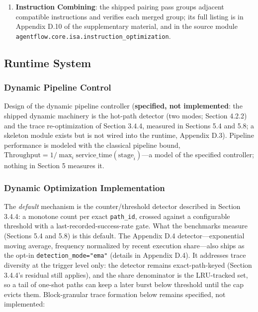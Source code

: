 \documentclass[
  sigconf,
  anonymous]{acmart}
\providecommand{\tightlist}{%
  \setlength{\itemsep}{0pt}\setlength{\parskip}{0pt}}
\begin{document}
\begin{enumerate}
\def\labelenumi{\arabic{enumi}.}
\setcounter{enumi}{1}
\tightlist
\item
  \textbf{Instruction Combining}: the shipped pairing pass groups
  adjacent compatible instructions and verifies each merged group; its
  full listing is in Appendix D.10 of the supplementary material, and in
  the source module
  \texttt{agentflow.core.isa.instruction\_optimization}.
\end{enumerate}

\subsection{Runtime System}\label{runtime-system}

\subsubsection{Dynamic Pipeline Control}\label{dynamic-pipeline-control}

Design of the dynamic pipeline controller (\textbf{specified, not
implemented}: the shipped dynamic machinery is the hot-path detector
(two modes; Section 4.2.2) and the trace re-optimization of Section
3.4.4, measured in Sections 5.4 and 5.8; a skeleton module exists but is
not wired into the runtime, Appendix D.3). Pipeline performance is
modeled with the classical pipeline bound,
\(\text{Throughput} = 1/\max_i \text{service\_time}(\text{stage}_i)\)---a
model of the specified controller; nothing in Section 5 measures it.

\subsubsection{Dynamic Optimization
Implementation}\label{dynamic-optimization-implementation}

The \emph{default} mechanism is the counter/threshold detector described
in Section 3.4.4: a monotone count per exact \texttt{path\_id}, crossed
against a configurable threshold with a last-recorded-success-rate gate.
What the benchmarks measure (Sections 5.4 and 5.8) is this default. The
Appendix D.4 detector---exponential moving average, frequency normalized
by recent execution share---also ships as the opt-in
\texttt{detection\_mode="ema"} (details in Appendix D.4). It addresses
trace diversity at the trigger level only: the detector remains
exact-path-keyed (Section 3.4.4's residual still applies), and the share
denominator is the LRU-tracked set, so a tail of one-shot paths can keep
a later burst below threshold until the cap evicts them. Block-granular
trace formation below remains specified, not implemented:
\end{document}
